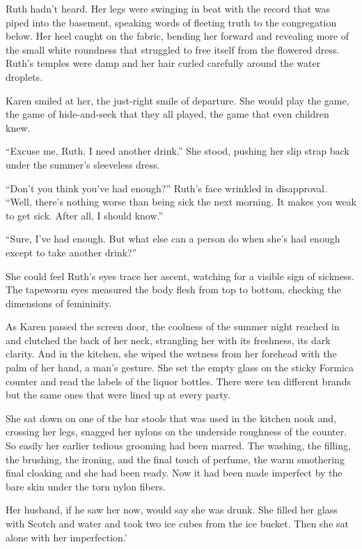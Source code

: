 \documentclass[twoside,10pt]{book}
\begin{document}
Ruth hadn't heard. Her legs were swinging in beat with the record that
was piped into the base­ment, speaking words of fleeting truth to the
congregation below. Her heel caught on the fabric, bend­ing her forward
and revealing more of the small white roundness that struggled to free
itself from the flowered dress. Ruth's temples were damp and her hair
curled carefully around the water droplets.

Karen smiled at her, the just-right smile of departure. She would play
the game, the game of hide-and-seek that they all played, the game that
even children knew.

``Excuse me, Ruth. I need another drink.'' She stood, pushing her slip
strap back under the summer's sleeveless dress.

``Don't you think you've had enough?'' Ruth's face wrinkled in
disapproval. ``Well, there's nothing worse than being sick the next
morning. It makes you weak to get sick. After all, I should know.''

``Sure, I've had enough. But what else can a person do when she's had
enough except to take another drink?''

She could feel Ruth's eyes trace her ascent, watching for a visible sign
of sickness. The tape­worm eyes measured the body flesh from top to
bottom, checking the dimensions of femininity.

As Karen passed the screen door, the coolness of the summer night
reached in and clutched the back of her neck, strangling her with its
freshness, its dark clarity. And in the kitchen, she wiped the wetness
from her forehead with the palm of her hand, a man's gesture. She set
the empty glass on the sticky Formica counter and read the labels of the
liquor bottles. There were ten different brands but the same ones that
were lined up at every party.

She sat down on one of the bar stools that was used in the kitchen nook
and, crossing her legs, snagged her nylons on the underside roughness of
the counter. So easily her earlier tedious grooming had been marred. The
washing, the filling, the brushing, the ironing, and the final touch of
perfume, the warm smothering final cloaking and she had been ready. Now
it had been made imperfect by the bare skin under the torn nylon fibers.

Her husband, if he saw her now, would say she was drunk. She filled her
glass with Scotch and water and took two ice cubes from the ice bucket.
Then she sat alone with her imperfection.'
\end{document}
